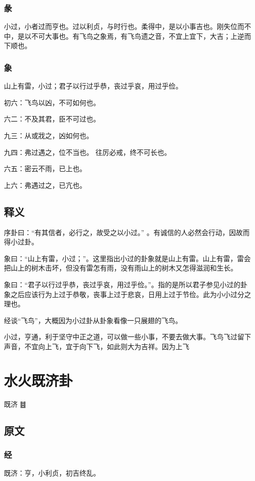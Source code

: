 \documentclass[12pt,oneside]{book}
\begin{document}
\subsection{彖}
小过，小者过而亨也。过以利贞，与时行也。柔得中，是以小事吉也。刚失位而不中，是以不可大事也。有飞鸟之象焉，有飞鸟遗之音，不宜上宜下，大吉；上逆而下顺也。

\subsection{象}
山上有雷，小过；君子以行过乎恭，丧过乎哀，用过乎俭。

初六：飞鸟以凶，不可如何也。

六二：不及其君，臣不可过也。

九三：从或戕之，凶如何也。

九四：弗过遇之，位不当也。 往厉必戒，终不可长也。

六五：密云不雨，已上也。

上六：弗遇过之，已亢也。

\section{释义}
序卦曰：“有其信者，必行之，故受之以小过。” 。有诚信的人必然会行动，因故而得小过卦。

象曰：“山上有雷，小过；”。这里指出小过的卦象就是山上有雷。山上有雷，雷会把山上的树木击坏，但没有雷怎有雨，没有雨山上的树木又怎得滋润和生长。

象曰：“君子以行过乎恭，丧过乎哀，用过乎俭。”。指的是所以君子参见小过的卦象之后应该行为上过于恭敬，丧事上过于悲哀，日用上过于节俭。此为小小过分之理也。

经谈“飞鸟”，大概因为小过卦从卦象看像一只展翅的飞鸟。

小过，亨通，利于坚守中正之道，可以做一些小事，不要去做大事。飞鸟飞过留下声音，不宜向上飞，宜于向下飞，如此则大为吉祥。因为上飞




\chapter{水火既济卦}
既济 {\Large ䷾}
\section{原文}

\subsection{经}
既济：亨，小利贞，初吉终乱。
\end{document}
